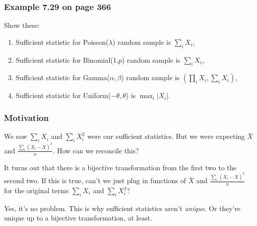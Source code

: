 \documentclass{beamer}
\begin{document}
\begin{frame}
\frametitle{Example 7.29 on page 366}

Show these:

\begin{enumerate}
\item Sufficient statistic for Poisson($\lambda$) random sample is $\sum_i X_i$,
\item Sufficient statistic for Binomial(1,$p$) random sample is $\sum_i X_i$,
\item Sufficient statistic for Gamma($\alpha, \beta$) random sample is $(\prod_i X_i, \sum_i X_i)$,
\item Sufficient statistic for Uniform($-\theta, \theta$) is $\max_i |X_i|$.
\end{enumerate}
\end{frame}
\begin{frame}
\frametitle{Motivation}

We saw $\sum_i X_i$ and $\sum_i X_i^2$ were our sufficient statistics. But we were expecting $\bar{X}$ and $\frac{\sum_i (X_i - \bar{X})^2}{n}$. How can we reconcile this?
\newline
\pause

It turns out that there is a bijective transformation from the first two to the second two. If this is true, can't we just plug in functions of $\bar{X}$ and $\frac{\sum_i (X_i - \bar{X})^2}{n}$ for the original terms $\sum_i X_i$ and $\sum_i X_i^2$?
\newline
\pause


Yes, it's no problem. This is why sufficient statistics aren't \emph{unique}. Or they're unique up to a bijective transformation, at least.
\end{frame}
\end{document}
